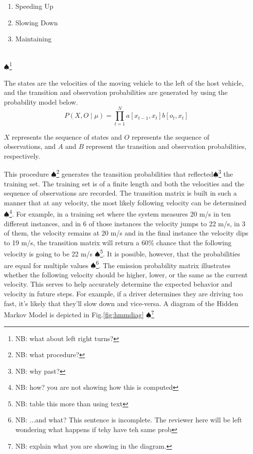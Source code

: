 \documentclass[conference]{IEEEtran}
\newcommand\NB[1]{$\spadesuit$\footnote{NB: #1}}
\begin{document}
\begin{varwidth}{\textwidth}
\begin{enumerate}
  \item Speeding Up
  \item Slowing Down
  \item Maintaining
\end{enumerate}
\end{varwidth}\\
\NB{what about left right turns?}

The states are the velocities of the moving vehicle to the left of the host vehicle, and the transition and observation probabilities are generated by using the probability model below.
\begin{equation}
P(X, O \mid \mu) = \prod_{t=1}^{N} a[x_{t-1},x_{t}]b[o_{t},x_{t}]
\end{equation}

$X$ represents the sequence of states and $O$ represents the sequence of observations, and $A$ and $B$ represent the transition and observation probabilities, respectively. 

This procedure \NB{what procedure?} generates the transition probabilities that reflected\NB{why past?} the training set. The training set is of a finite length and both the velocities and the sequence of observations are recorded. The transition matrix is built in such a manner that at any velocity, the most likely following velocity can be determined \NB{how? you are not showing how this is computed}. For example, in a training set where the system measures 20 m/s in ten different instances, and in 6 of those instances the velocity jumps to 22 m/s, in 3 of them, the velocity remains at 20 m/s and in the final instance the velocity dips to 19 m/s, the transition matrix will return a 60\% chance that the following velocity is going to be 22 m/s \NB{table this more than using text}. It is possible, however, that the probabilities are equal for multiple values \NB{...and what? This sentence is incomplete. The reviewer here will be left wondering what happens if tehy have teh same prob}. The emission probability matrix illustrates whether the following velocity should be higher, lower, or the same as the current velocity. This serves to help accurately determine the expected behavior and velocity in future steps. For example, if a driver determines they are driving too fast, it's likely that they'll slow down and vice-versa. A diagram of the Hidden Markov Model is depicted in Fig.\ref{fig:hmmdiag} \NB{explain what you are showing in the diagram.}
\end{document}
